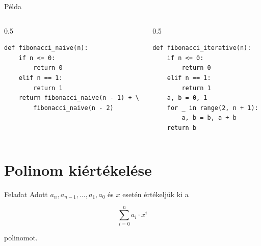\documentclass[hungarian]{beamer}
\begin{document}
\begin{frame}[fragile]{Példa}


\begin{columns}

\begin{column}{0.5\linewidth}
\begin{verbatim}
def fibonacci_naive(n):
    if n <= 0:
        return 0
    elif n == 1:
        return 1
    return fibonacci_naive(n - 1) + \
        fibonacci_naive(n - 2)
\end{verbatim}
\end{column}
\begin{column}{0.5\linewidth}
\begin{verbatim}
def fibonacci_iterative(n):
    if n <= 0:
        return 0
    elif n == 1:
        return 1
    a, b = 0, 1
    for _ in range(2, n + 1):
        a, b = b, a + b
    return b
\end{verbatim}

\end{column}

\end{columns}
    
\end{frame}

\section{Polinom kiértékelése}

\begin{frame}{Feladat}
Adott $a_n, a_{n-1}, \dots, a_1, a_0$ és $x$ esetén értékeljük ki a

$$\sum_{i=0}^n a_i \cdot x^i$$

polinomot.

\end{frame}
\end{document}
